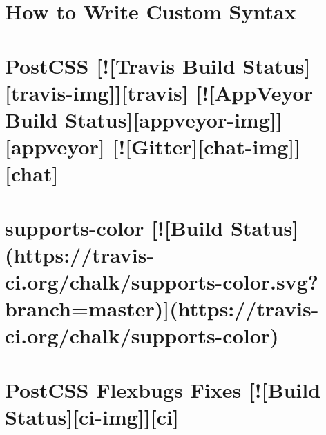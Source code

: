 \documentclass[twoside]{book}
\newcommand{\+}{\discretionary{\mbox{\scriptsize$\hookleftarrow$}}{}{}}
\begin{document}
\chapter{How to Write Custom Syntax}
\label{md__c_1_workspace_demo_src_main_script_node_modules_postcss-flexbugs-fixes_node_modules_postcss_docs_syntax}

\chapter{Post\+C\+SS \mbox{[}!\mbox{[}Travis Build Status\mbox{]}\mbox{[}travis-\/img\mbox{]}\mbox{]}\mbox{[}travis\mbox{]} \mbox{[}!\mbox{[}App\+Veyor Build Status\mbox{]}\mbox{[}appveyor-\/img\mbox{]}\mbox{]}\mbox{[}appveyor\mbox{]} \mbox{[}!\mbox{[}Gitter\mbox{]}\mbox{[}chat-\/img\mbox{]}\mbox{]}\mbox{[}chat\mbox{]}}
\label{md__c_1_workspace_demo_src_main_script_node_modules_postcss-flexbugs-fixes_node_modules_postcss__r_e_a_d_m_e}

\chapter{supports-\/color \mbox{[}!\mbox{[}Build Status\mbox{]}(https\+://travis-\/ci.org/chalk/supports-\/color.svg?branch=master)\mbox{]}(https\+://travis-\/ci.org/chalk/supports-\/color)}
\label{md__c_1_workspace_demo_src_main_script_node_modules_postcss-flexbugs-fixes_node_modules_supports-color_readme}

\chapter{Post\+C\+SS Flexbugs Fixes \mbox{[}!\mbox{[}Build Status\mbox{]}\mbox{[}ci-\/img\mbox{]}\mbox{]}\mbox{[}ci\mbox{]}}
\label{md__c_1_workspace_demo_src_main_script_node_modules_postcss-flexbugs-fixes__r_e_a_d_m_e}

\end{document}
